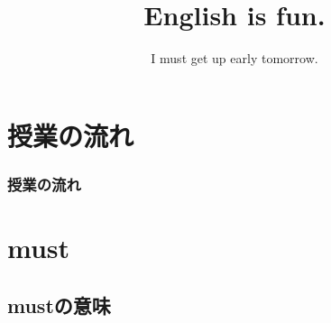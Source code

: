 \documentclass[aspectratio=169,xcolor={dvipsnames,table}]{beamer}
\title{English is fun.}
\subtitle{I must get up early tomorrow.}
\author{}
\institute[]{}
\date[]
\begin{document}
\begin{frame}[plain]
  \titlepage
\end{frame}

\section*{授業の流れ}
\begin{frame}[plain]
  \frametitle{授業の流れ}
  \tableofcontents
\end{frame}


\section{must}

\subsection{mustの意味}
\end{document}
